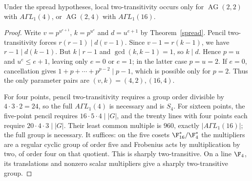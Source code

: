 \begin{proposition}\label{onedim2t}
Under the spread hypotheses, local two-transitivity occurs only for
$\operatorname{AG}(2,2)$ with $A\Gamma L_1(4)$, or
$\operatorname{AG}(2,4)$ with $A\Gamma L_1(16)$.
\end{proposition}
\begin{proof}
Write $v=p^{u^{e+1}}$, $k=p^{u^e}$ and $d=u^{e+1}$ by
Theorem~\ref{spread}. Pencil two-transitivity forces
$r(r-1)\mid d(v-1)$. Since $v-1=r(k-1)$, we have
$r-1\mid d(k-1)$. But $k\mid r-1$ and $\gcd(k,k-1)=1$,
so $k\mid d$. Hence $p=u$ and $u^e\le e+1$, leaving only $e=0$
or $e=1$; in the latter case $p=u=2$. If $e=0$, cancellation gives
$1+p+\cdots+p^{p-2}\mid p-1$, which is possible only for $p=2$.
Thus the only parameter pairs are $(v,k)=(4,2),(16,4)$.

For four points, pencil two-transitivity requires a group order
divisible by $4\cdot3\cdot2=24$, so the full $A\Gamma L_1(4)$ is
necessary and is $S_4$. For sixteen points, the five-point pencil
requires $16\cdot5\cdot4\mid |G|$, and the twenty lines with four
points each require $20\cdot4\cdot3\mid |G|$. Their least common
multiple is $960$, exactly $|A\Gamma L_1(16)|$; the full group is
necessary. It suffices: on the five cosets $\F_{16}^*/\F_4^*$ the
multipliers are a regular cyclic group of order five and Frobenius
acts by multiplication by two, of order four on that quotient.
This is sharply two-transitive. On a line $\F_4$, its translations
and nonzero scalar multipliers give a sharply two-transitive group.
\end{proof}
